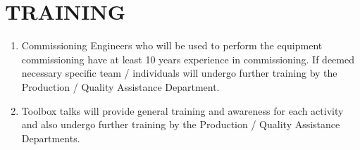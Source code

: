 \section{TRAINING}
\begin{enumerate}
\item	Commissioning Engineers who will be used to perform the equipment commissioning have at least 10 years experience in  commissioning.  If deemed necessary specific team / individuals will undergo further training by the Production / Quality Assistance Department.

\item	Toolbox talks will provide general training and awareness for each activity and also undergo further training by the Production / Quality Assistance Departments.
\end{enumerate}